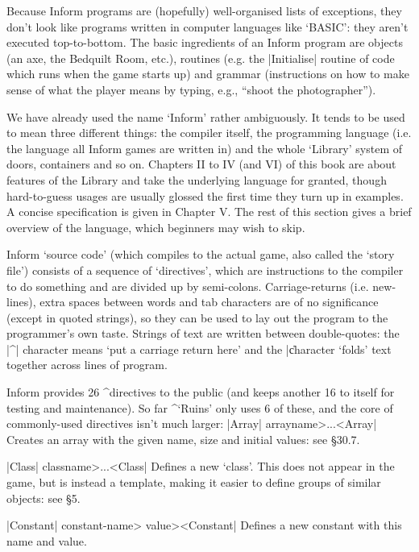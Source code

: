 Because Inform programs are (hopefully) well-organised lists of exceptions,
they don't look like programs written in computer languages like `BASIC':
they aren't executed top-to-bottom.  The basic ingredients of an Inform
program are objects (an axe, the Bedquilt Room, etc.), routines (e.g. the
|Initialise| routine of code which runs when the game starts up) and grammar
(instructions on how to make sense of what the player means by typing, e.g.,
``shoot the photographer'').
\medskip

We have already used the name `Inform' rather ambiguously.  It tends to be
used to mean three different things: the compiler itself, the
programming language (i.e. the language all Inform games are written in) and
the whole `Library' system of doors, containers and so on.  Chapters II
to IV (and VI) of this book are about features of the Library and take the
underlying language for granted, though hard-to-guess usages are usually
glossed the first time they turn up in examples.  A concise specification
is given in Chapter V.
\bigskip
\noindent
The rest of this section gives a brief overview of the language, which
beginners may wish to skip.
\medskip

Inform `source code' (which compiles to the actual game, also called the
`story file') consists of a sequence of `directives', which are instructions
to the compiler to do something and are divided up by semi-colons. 
Carriage-returns (i.e. new-lines), extra spaces between words and tab
characters are of no significance (except in quoted strings), so they can be
used to lay out the program to the programmer's own taste.  Strings of
text are written between double-quotes: the |^| character means `put a
carriage return here' and the |\| character `folds' text together across
lines of program.

Inform provides 26 ^{directives} to the public (and keeps another 16 to itself
for testing and maintenance).  So far ^{`Ruins'} only uses 6 of these,
and the core of commonly-used directives isn't much larger:
\medskip
\noindent|Array| \<arrayname>...^^|Array|\quad
Creates an array with the given name, size and initial values: see \S 30.7.

\noindent|Class| \<classname>...^^|Class|\quad
Defines a new `class'.  This does not appear in the game, but is instead
a template, making it easier to define groups of similar objects: see \S 5.

\noindent|Constant| \<constant-name> \<value>^^|Constant|\quad
Defines a new constant with this name and value.

